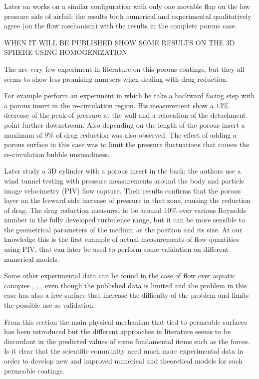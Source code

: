 Later on \citet{rosti2017pelskin} works on a similar configuration with only one movable flap on the low pressure side of airfoil; the results both numerical and experimental qualitatively agree (on the flow mechanism) with the results in the complete porous case.


WHEN IT WILL BE PUBLISHED SHOW SOME RESULTS ON THE 3D SPHERE USING HOMOGENIZATION \citet{zampogna2017new}

The are very few experiment in literature on this porous coatings, but they all seems to show less promising numbers when  dealing with drag reduction.

For example \citet{heenan1998passive} perform an experiment in which he take a backward facing step with a porous insert in the re-circulation region.
His measurement show a $13\%$ decrease of the peak of pressure at the wall and a relocation of the detachment point further downstream.
Also depending on the length of the porous insert a maximum of $9\%$ of drag reduction was also observed.
The effect of adding a porous surface in this case was to limit the pressure fluctuations that causes the re-circulation bubble unsteadiness.

Later \citet{klausmann2017drag} study a 3D cylinder with a porous insert in the back; the authors use a wind tunnel testing with pressure measurements around the body and particle image velocimetry (PIV) flow capture.
Their results confirms that the porous layer on the leeward side increase of pressure in that zone, causing the reduction of drag.
The drag reduction measured to be around $10\%$ over various Reynolds number in the fully developed turbulence range, but it can be more sensible to the geometrical parameters of the medium as the position and its size.
At our knowledge this is the first example of actual measurements of flow quantities using PIV, that can later be used to perform some validation on different numerical models.

Some other experimental data can be found in the case of flow over aquatic canopies \citet{zhang2011exchange}, \citet{segalini2011experimental}, \citet{hamed2017impact}, even though the published data is limited and the problem in this case has also a free surface that increase the difficulty of the problem and limits the possible use as validation.

From this section the main physical mechanism that tied to permeable surfaces has been introduced but the different approaches in literature seems to be discordant in the predicted values of some fundamental items such as the forces.
Is it clear that the scientific community need much more experimental data in order to develop new and improved numerical and theoretical models for such permeable coatings.

